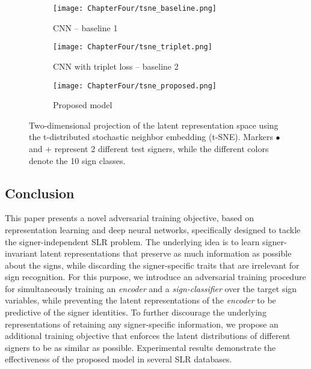 \begin{figure}
    \centering
    \begin{subfigure}[t]{0.32\textwidth}
        \texttt{[image: ChapterFour/tsne\_baseline.png]}
        \caption{CNN -- baseline 1}
        \label{fig:adv_signer_inv_tsne_a}
    \end{subfigure}
    \begin{subfigure}[t]{0.32\textwidth}
        \texttt{[image: ChapterFour/tsne\_triplet.png]}
        \caption{CNN with triplet loss -- baseline 2}
        \label{fig:adv_signer_inv_tsne_b}
    \end{subfigure}
    \begin{subfigure}[t]{0.32\textwidth}
        \texttt{[image: ChapterFour/tsne\_proposed.png]}
        \caption{Proposed model}
        \label{fig:adv_signer_inv_tsne_c}
    \end{subfigure}
    \caption{\centering Two-dimensional projection of the latent representation space using the t-distributed stochastic neighbor embedding (t-SNE). Markers $\bullet$ and $\textbf{+}$ represent 2 different test signers, while the different colors denote the 10 sign classes.}
    \label{fig:adv_signer_inv_tsne}
\end{figure}

\subsection{Conclusion}
\label{sec:adv_signer_inv_conclusion}

This paper presents a novel adversarial training objective, based on representation learning and deep neural networks, specifically designed to tackle the signer-independent SLR problem. The underlying idea is to learn signer-invariant latent representations that preserve as much information as possible about the signs, while discarding the signer-specific traits that are irrelevant for sign recognition. For this purpose, we introduce  an adversarial training procedure for simultaneously training an \textit{encoder} and a \textit{sign-classifier} over the target sign variables, while preventing the latent representations of the \textit{encoder} to be predictive of the signer identities. To further discourage the underlying representations of retaining any signer-specific information, we propose an additional training objective that enforces the latent distributions of different signers to be as similar as possible.
Experimental results demonstrate the effectiveness of the proposed model in several SLR databases.

